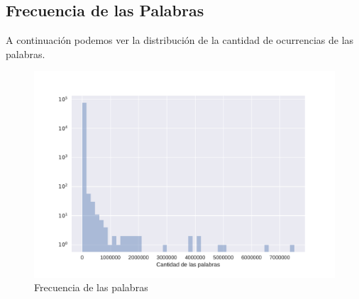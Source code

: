 






\subsection{Frecuencia de las Palabras}
\label{sub: frecuenciaPalabras}
A continuación podemos ver la distribución de la cantidad de ocurrencias de las palabras.
\begin{figure}[ht]
\centering
\includegraphics[scale=0.6]{./images/DistribucionOcurrenciasPalabras.pdf} 
\caption{Frecuencia de las palabras} 
\label{fig:cantPalabras} 
\end{figure}

